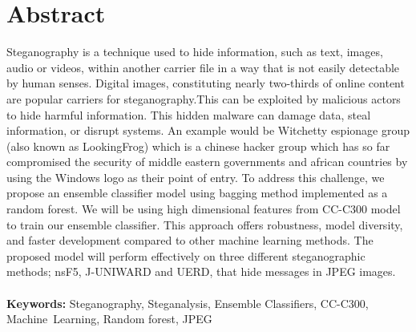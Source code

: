 \chapter*{Abstract} 
\thispagestyle{plain}
\setcounter{page}{1}
\sloppy
Steganography is a technique used to hide information, such as text, images, audio or videos, within another carrier file in a way that is not easily detectable by human senses. Digital images, constituting nearly two-thirds of online content are popular carriers for steganography.This can be exploited by malicious actors to hide harmful information. This hidden malware can damage data, steal information, or disrupt systems. An example would be Witchetty espionage group (also known as LookingFrog) which is a chinese hacker group which has so far compromised the security of middle eastern governments and african countries by using the Windows logo as their point of entry. To address this challenge, we propose an ensemble classifier model using bagging method implemented as a random forest. We will be using high dimensional features from CC-C300 model to train our ensemble classifier. This approach offers robustness, model diversity, and faster development compared to other machine learning methods. The proposed model will perform effectively on three different steganographic methods; nsF5, J-UNIWARD and UERD, that hide messages in JPEG images.\\ \\
\normalsize{\textbf{Keywords:} Steganography, Steganalysis, Ensemble Classifiers, CC-C300, \mbox{Machine Learning}, Random forest, JPEG }


